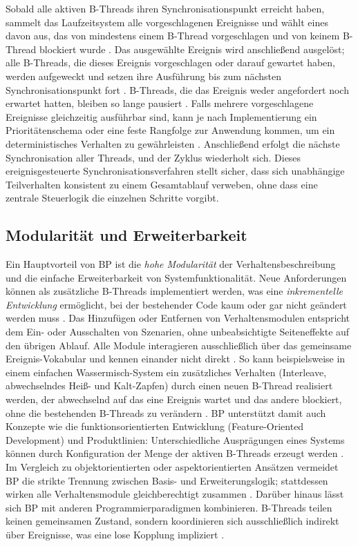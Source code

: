 Sobald alle aktiven B-Threads ihren Synchronisationspunkt erreicht haben, sammelt das Laufzeitsystem alle vorgeschlagenen Ereignisse und wählt eines davon aus, das von mindestens einem B-Thread vorgeschlagen und von keinem B-Thread blockiert wurde \cite{Harel2012}.
Das ausgewählte Ereignis wird anschließend ausgelöst; alle B-Threads, die dieses Ereignis vorgeschlagen oder darauf gewartet haben, werden aufgeweckt und setzen ihre Ausführung bis zum nächsten Synchronisationspunkt fort \cite{Harel2012}.
B-Threads, die das Ereignis weder angefordert noch erwartet hatten, bleiben so lange pausiert \cite{Harel2012}.
Falls mehrere vorgeschlagene Ereignisse gleichzeitig ausführbar sind, kann je nach Implementierung ein Prioritätenschema oder eine feste Rangfolge zur Anwendung kommen, um ein deterministisches Verhalten zu gewährleisten \cite{Harel2012}.
Anschließend erfolgt die nächste Synchronisation aller Threads, und der Zyklus wiederholt sich.
Dieses ereignisgesteuerte Synchronisationsverfahren stellt sicher, dass sich unabhängige Teilverhalten konsistent zu einem Gesamtablauf verweben, ohne dass eine zentrale Steuerlogik die einzelnen Schritte vorgibt.

\subsection{Modularität und Erweiterbarkeit}\label{subsec:modularitat-und-erweiterbarkeit}
Ein Hauptvorteil von BP ist die \emph{hohe Modularität} der Verhaltensbeschreibung und die einfache Erweiterbarkeit von Systemfunktionalität.
Neue Anforderungen können als zusätzliche B-Threads implementiert werden, was eine \emph{inkrementelle Entwicklung} ermöglicht, bei der bestehender Code kaum oder gar nicht geändert werden muss \cite{Harel2012}.
\newline
Das Hinzufügen oder Entfernen von Verhaltensmodulen entspricht dem Ein- oder Ausschalten von Szenarien, ohne unbeabsichtigte Seiteneffekte auf den übrigen Ablauf.
\newline
\newline
Alle Module interagieren ausschließlich über das gemeinsame Ereignis-Vokabular und kennen einander nicht direkt \cite{Harel2010}.
So kann beispielsweise in einem einfachen Wassermisch-System ein zusätzliches Verhalten (Interleave, abwechselndes Heiß- und Kalt-Zapfen) durch einen neuen B-Thread realisiert werden, der abwechselnd auf das eine Ereignis wartet und das andere blockiert, ohne die bestehenden B-Threads zu verändern \cite{Harel2012}.
\newline
\newline
BP unterstützt damit auch Konzepte wie die funktionsorientierten Entwicklung (Feature-Oriented Development) und Produktlinien: Unterschiedliche Ausprägungen eines Systems können durch Konfiguration der Menge der aktiven B-Threads erzeugt werden \cite{Harel2012}.
Im Vergleich zu objektorientierten oder aspektorientierten Ansätzen vermeidet BP die strikte Trennung zwischen Basis- und Erweiterungslogik; stattdessen wirken alle Verhaltensmodule gleichberechtigt zusammen \cite{Harel2012}.
Darüber hinaus lässt sich BP mit anderen Programmierparadigmen kombinieren.
B-Threads teilen keinen gemeinsamen Zustand, sondern koordinieren sich ausschließlich indirekt über Ereignisse, was eine lose Kopplung impliziert \cite{Harel2012}.

